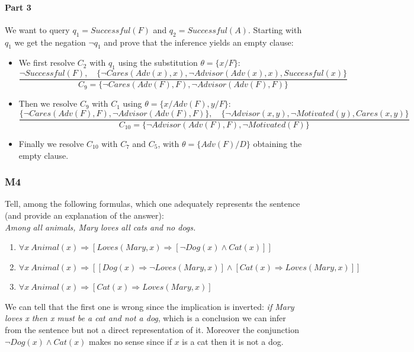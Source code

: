 \documentclass[10pt,a4paper]{article}
\begin{document}
\begin{itemize}
\paragraph{Part 3}
We want to query $q_1=Successful(F)$ and $q_2=Successful(A)$. Starting with $q_1$ we get the negation $\neg q_1$ and prove that the inference yields an empty clause:

\begin{itemize}
\item We first resolve $C_2$ with $q_1$ using the substitution $\theta=\{x/F\}$:
\[\frac{\neg Successful(F),\quad \lbrace  \neg Cares(Adv(x),x), \neg Advisor(Adv(x),x), Successful(x)\rbrace}{C_9=\lbrace  \neg Cares(Adv(F),F), \neg Advisor(Adv(F),F)\rbrace}\]
\item Then we resolve $C_9$ with $C_1$ using $\theta=\{x/Adv(F),y/F\}$:
\[\frac{\lbrace  \neg Cares(Adv(F),F), \neg Advisor(Adv(F),F)\rbrace,\quad \lbrace \neg Advisor(x,y), \neg Motivated(y), Cares(x,y)\rbrace}{C_{10}=\lbrace \neg Advisor(Adv(F),F),\neg Motivated(F) \rbrace}\]
\item Finally we resolve $C_{10}$ with $C_7$ and $C_5$, with $\theta=\{Adv(F)/D\}$ obtaining the empty clause.
\end{itemize}

\subsubsection{M4}
Tell, among the following formulas, which one adequately represents the sentence (and provide an explanation of the answer):\\
\textit{Among all animals, Mary loves all cats and no dogs.}\\
\begin{enumerate}
\item $\forall x\ Animal(x)\Rightarrow[Loves(Mary,x)\Rightarrow[\neg Dog(x)\wedge Cat(x)]]$
\item $\forall x\ Animal(x)\Rightarrow[[Dog(x)\Rightarrow \neg Loves(Mary,x)]\wedge [ Cat(x)\Rightarrow Loves(Mary,x)]]$
\item $\forall x\ Animal(x)\Rightarrow[Cat(x)\Rightarrow Loves(Mary,x)]$
\end{enumerate}

We can tell that the first one is wrong since the implication is inverted: \textit{if Mary loves x then x must be a cat and not a dog}, which is a conclusion we can infer from the sentence but not a direct representation of it. Moreover the conjunction $\neg Dog(x)\wedge Cat(x)$ makes no sense since if $x$ is a cat then it is not a dog.\\


\end{itemize}
\end{document}
